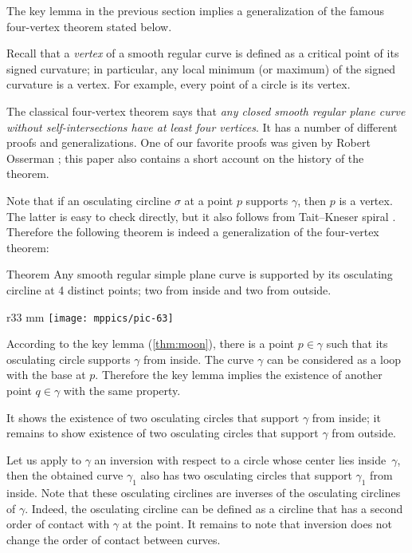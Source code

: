 \documentclass{article}
\begin{document}
The key lemma in the previous section implies a generalization of the famous four-vertex theorem stated below.

Recall that a \emph{vertex} of a smooth regular curve is defined as a critical point of its signed curvature;
in particular, any local minimum (or maximum) of the signed curvature is a vertex.
For example, every point of a circle is its vertex.

The classical four-vertex theorem says that \emph{any closed smooth regular plane curve without self-intersections have at least four vertices}.
It has a number of different proofs and generalizations.
One of our favorite proofs was given by Robert Osserman \cite{osserman}; this paper also contains a short account on the history of the theorem.

Note that if an osculating circline $\sigma$ at a point $p$ supports $\gamma$, then $p$ is a vertex.
The latter is easy to check directly, but it also follows from Tait--Kneser spiral \cite{ghys-tabachnikov-timorin}.
Therefore the following theorem is indeed a generalization of the four-vertex theorem:

\begin{thm}{Theorem}\label{thm:4-vert}
Any smooth regular simple plane curve is supported by its osculating circline at 4 distinct points; two from inside and two from outside.
\end{thm}

\begin{wrapfigure}{r}{33 mm}
\vskip-0mm
\centering
\texttt{[image: mppics/pic-63]}
\vskip0mm
\end{wrapfigure}

According to the key lemma (\ref{thm:moon}), there is a point $p\in\gamma$ such that its osculating circle supports $\gamma$ from inside.
The curve $\gamma$ can be considered as a loop with the base at $p$.
Therefore the key lemma implies the existence of another point $q\in\gamma$ with the same property.

It shows the existence of two osculating circles that support $\gamma$ from inside;
it remains to show existence of two osculating circles that support $\gamma$ from outside.

Let us apply to $\gamma$ an inversion with respect to a circle whose center lies inside~$\gamma$, then the obtained curve $\gamma_1$ also has  two osculating circles that support $\gamma_1$ from inside.
Note that these osculating circlines are inverses of the osculating circlines of $\gamma$.
Indeed, the osculating circline can be defined as a circline that has a second order of contact with $\gamma$ at the point.
It remains to note that inversion does not change the order of contact between curves.
\end{document}
